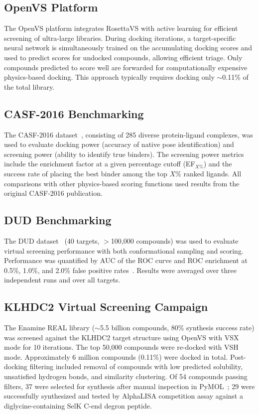 \documentclass[11pt]{article}
\begin{document}
\subsection{OpenVS Platform}

The OpenVS platform integrates RosettaVS with active learning for efficient screening of ultra-large libraries. During docking iterations, a target-specific neural network is simultaneously trained on the accumulating docking scores and used to predict scores for undocked compounds, allowing efficient triage. Only compounds predicted to score well are forwarded for computationally expensive physics-based docking. This approach typically requires docking only ${\sim}$0.11\% of the total library.

\subsection{CASF-2016 Benchmarking}

The CASF-2016 dataset~\citep{su2016casf2016}, consisting of 285 diverse protein-ligand complexes, was used to evaluate docking power (accuracy of native pose identification) and screening power (ability to identify true binders). The screening power metrics include the enrichment factor at a given percentage cutoff (EF$_{X\%}$) and the success rate of placing the best binder among the top $X$\% ranked ligands. All comparisons with other physics-based scoring functions used results from the original CASF-2016 publication.

\subsection{DUD Benchmarking}

The DUD dataset~\citep{huang2006dud} (40 targets, $>$100,000 compounds) was used to evaluate virtual screening performance with both conformational sampling and scoring. Performance was quantified by AUC of the ROC curve and ROC enrichment at 0.5\%, 1.0\%, and 2.0\% false positive rates~\citep{truchon2007roc}. Results were averaged over three independent runs and over all targets.

\subsection{KLHDC2 Virtual Screening Campaign}

The Enamine REAL library (${\sim}$5.5 billion compounds, 80\% synthesis success rate) was screened against the KLHDC2 target structure using OpenVS with VSX mode for 10 iterations. The top 50,000 compounds were re-docked with VSH mode. Approximately 6 million compounds (0.11\%) were docked in total. Post-docking filtering included removal of compounds with low predicted solubility, unsatisfied hydrogen bonds, and similarity clustering. Of 54 compounds passing filters, 37 were selected for synthesis after manual inspection in PyMOL~\citep{pymol2015}; 29 were successfully synthesized and tested by AlphaLISA competition assay against a diglycine-containing SelK C-end degron peptide.
\end{document}
